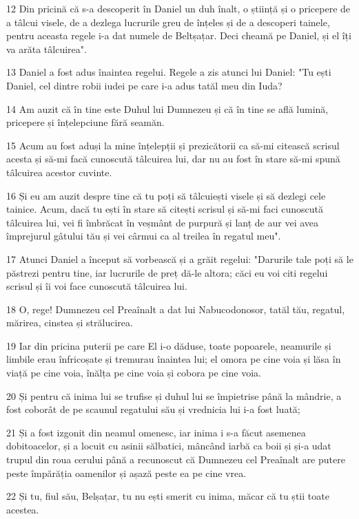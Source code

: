 \par 12 Din pricină că s-a descoperit în Daniel un duh înalt, o știință și o pricepere de a tâlcui visele, de a dezlega lucrurile greu de înțeles și de a descoperi tainele, pentru aceasta regele i-a dat numele de Beltșațar. Deci cheamă pe Daniel, și el îți va arăta tâlcuirea".
\par 13 Daniel a fost adus înaintea regelui. Regele a zis atunci lui Daniel: "Tu ești Daniel, cel dintre robii iudei pe care i-a adus tatăl meu din Iuda?
\par 14 Am auzit că în tine este Duhul lui Dumnezeu și că în tine se află lumină, pricepere și înțelepciune fără seamăn.
\par 15 Acum au fost aduși la mine înțelepții și prezicătorii ca să-mi citească scrisul acesta și să-mi facă cunoscută tâlcuirea lui, dar nu au fost în stare să-mi spună tâlcuirea acestor cuvinte.
\par 16 Și eu am auzit despre tine că tu poți să tâlcuiești visele și să dezlegi cele tainice. Acum, dacă tu ești în stare să citești scrisul și să-mi faci cunoscută tâlcuirea lui, vei fi îmbrăcat în veșmânt de purpură și lanț de aur vei avea împrejurul gâtului tău și vei cârmui ca al treilea în regatul meu".
\par 17 Atunci Daniel a început să vorbească și a grăit regelui: "Darurile tale poți să le păstrezi pentru tine, iar lucrurile de preț dă-le altora; căci eu voi citi regelui scrisul și îi voi face cunoscută tâlcuirea lui.
\par 18 O, rege! Dumnezeu cel Preaînalt a dat lui Nabucodonosor, tatăl tău, regatul, mărirea, cinstea și strălucirea.
\par 19 Iar din pricina puterii pe care El i-o dăduse, toate popoarele, neamurile și limbile erau înfricoșate și tremurau înaintea lui; el omora pe cine voia și lăsa în viață pe cine voia, înălța pe cine voia și cobora pe cine voia.
\par 20 Și pentru că inima lui se trufise și duhul lui se împietrise până la mândrie, a fost coborât de pe scaunul regatului său și vrednicia lui i-a fost luată;
\par 21 Și a fost izgonit din neamul omenesc, iar inima i s-a făcut asemenea dobitoacelor, și a locuit cu asinii sălbatici, mâncând iarbă ca boii și și-a udat trupul din roua cerului până a recunoscut că Dumnezeu cel Preaînalt are putere peste împărăția oamenilor și așază peste ea pe cine vrea.
\par 22 Și tu, fiul său, Belșațar, tu nu ești smerit cu inima, măcar că tu știi toate acestea.
